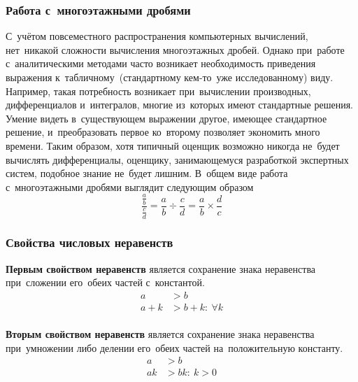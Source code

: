 \documentclass[]{scrartcl}
\begin{document}
\subsubsection{Работа с~многоэтажными дробями}

С~учётом повсеместного распространения компьютерных вычислений, нет~никакой сложности вычисления многоэтажных дробей. Однако при~работе с~аналитическими методами часто возникает необходимость приведения выражения к~табличному~(стандартному кем-то~уже исследованному) виду. Например, такая потребность возникает при~вычислении производных, дифференциалов и~интегралов, многие из~которых имеют стандартные решения. Умение видеть в~существующем выражении другое, имеющее стандартное решение, и~преобразовать первое ко~второму позволяет экономить много времени. Таким образом, хотя типичный оценщик возможно никогда не~будет вычислять дифференциалы, оценщику, занимающемуся разработкой экспертных систем, подобное знание не~будет лишним.
В~общем виде работа с~многоэтажными дробями выглядит следующим образом
\begin{equation}\label{eq:multilevel-frac}
\frac{\frac{a}{b}}{\frac{c}{d}} = \frac{a}{b} \div \frac{c}{d} = \frac{a}{b} \times \frac{d}{c}
\end{equation}

\subsubsection{Свойства числовых неравенств}
\textbf{Первым свойством неравенств} является сохранение знака неравенства при~сложении его~обеих частей с~константой.
\begin{equation}\label{eq:enequalities-property1}
	\begin{aligned}
	a&>b \\
	a+k&>b+k:\ \forall k\\
	\end{aligned}
\end{equation}

\textbf{Вторым свойством неравенств} является сохранение знака неравенства при~умножении либо делении его~обеих частей на~положительную константу.
\begin{equation}\label{eq:enequalities-property2}
\begin{aligned}
a&>b \\
ak&>bk:\ k>0\\
\end{aligned}
\end{equation}
\end{document}
